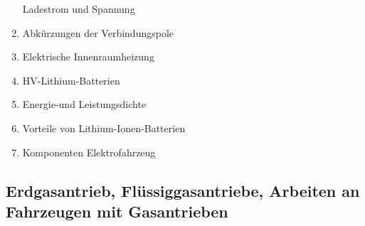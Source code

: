 \begin{enumerate}
  Ladestrom und Spannung\\
\item
  Abkürzungen der Verbindungspole\\
\item
  Elektrische Innenraumheizung\\
\item
  HV-Lithium-Batterien\\
\item
  Energie-und Leistungsdichte\\
\item
  Vorteile von Lithium-Ionen-Batterien\\
\item
  Komponenten Elektrofahrzeug
\end{enumerate}

\subsection{Erdgasantrieb, Flüssiggasantriebe, Arbeiten an Fahrzeugen
mit
Gasantrieben}\label{erdgasantrieb-fluessiggasantriebe-arbeiten-an-fahrzeugen-mit-gasantrieben}


